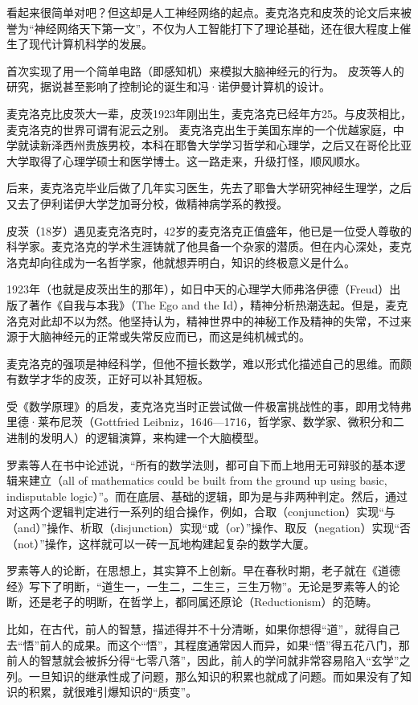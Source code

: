 看起来很简单对吧？但这却是人工神经网络的起点。麦克洛克和皮茨的论文后来被誉为“神经网络天下第一文”，不仅为人工智能打下了理论基础，还在很大程度上催生了现代计算机科学的发展。


首次实现了用一个简单电路（即感知机）来模拟大脑神经元的行为。
皮茨等人的研究，据说甚至影响了控制论的诞生和冯·诺伊曼计算机的设计。

麦克洛克比皮茨大一辈，皮茨1923年刚出生，麦克洛克已经年方25。与皮茨相比，麦克洛克的世界可谓有泥云之别。
麦克洛克出生于美国东岸的一个优越家庭，中学就读新泽西州贵族男校，本科在耶鲁大学学习哲学和心理学，之后又在哥伦比亚大学取得了心理学硕士和医学博士。这一路走来，升级打怪，顺风顺水。

后来，麦克洛克毕业后做了几年实习医生，先去了耶鲁大学研究神经生理学，之后又去了伊利诺伊大学芝加哥分校，做精神病学系的教授。

皮茨（18岁）遇见麦克洛克时，42岁的麦克洛克正值盛年，他已是一位受人尊敬的科学家。麦克洛克的学术生涯铸就了他具备一个杂家的潜质。但在内心深处，麦克洛克却向往成为一名哲学家，他就想弄明白，知识的终极意义是什么。

1923年（也就是皮茨出生的那年），如日中天的心理学大师弗洛伊德（Freud）出版了著作《自我与本我》（The Ego and the Id），精神分析热潮迭起。但是，麦克洛克对此却不以为然。他坚持认为，精神世界中的神秘工作及精神的失常，不过来源于大脑神经元的正常或失常反应而已，而这是纯机械式的。

麦克洛克的强项是神经科学，但他不擅长数学，难以形式化描述自己的思维。而颇有数学才华的皮茨，正好可以补其短板。

受《数学原理》的启发，麦克洛克当时正尝试做一件极富挑战性的事，即用戈特弗里德·莱布尼茨（Gottfried Leibniz，1646—1716，哲学家、数学家、微积分和二进制的发明人）的逻辑演算，来构建一个大脑模型。

罗素等人在书中论述说，“所有的数学法则，都可自下而上地用无可辩驳的基本逻辑来建立（all of mathematics could be built from the ground up using basic, indisputable logic）”。而在底层、基础的逻辑，即为是与非两种判定。然后，通过对这两个逻辑判定进行一系列的组合操作，例如，合取（conjunction）实现“与（and）”操作、析取（disjunction）实现“或（or）”操作、取反（negation）实现“否（not）”操作，这样就可以一砖一瓦地构建起复杂的数学大厦。

罗素等人的论断，在思想上，其实算不上创新。早在春秋时期，老子就在《道德经》写下了明断，“道生一，一生二，二生三，三生万物”。无论是罗素等人的论断，还是老子的明断，在哲学上，都同属还原论（Reductionism）的范畴。

比如，在古代，前人的智慧，描述得并不十分清晰，如果你想得“道”，就得自己去“悟”前人的成果。而这个“悟”，其程度通常因人而异，如果“悟”得五花八门，那前人的智慧就会被拆分得“七零八落”，因此，前人的学问就非常容易陷入“玄学”之列。一旦知识的继承性成了问题，那么知识的积累也就成了问题。而如果没有了知识的积累，就很难引爆知识的“质变”。

